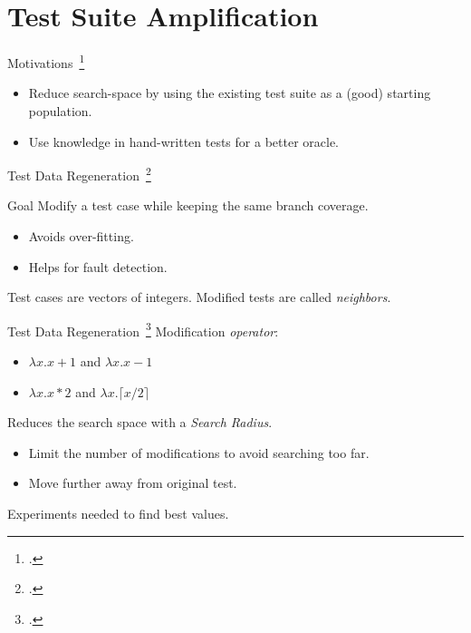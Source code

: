 \documentclass{beamer}
\begin{document}
\section{Test Suite Amplification}

\begin{frame}{Motivations~\footcite{danglot2017emerging}}
  \begin{itemize}
    \item Reduce search-space by using the existing test suite as a (good) starting population.
    \item Use knowledge in hand-written tests for a better oracle.
  \end{itemize}
\end{frame}

\begin{frame}{Test Data Regeneration~\footcite{yoo2012test}}
  \begin{block}{Goal}
    Modify a test case while keeping the same branch coverage.
    \begin{itemize}
      \item Avoids over-fitting.
      \item Helps for fault detection.
    \end{itemize}
  \end{block}

  Test cases are vectors of integers.
  Modified tests are called \emph{neighbors}.
\end{frame}
\begin{frame}{Test Data Regeneration~\footcite{yoo2012test}}
  Modification \emph{operator}:
  \begin{itemize}
    \item $\lambda x. x + 1$ and $\lambda x. x - 1$
    \item $\lambda x. x * 2$ and $\lambda x. \lceil x / 2\rceil$
  \end{itemize}

  \pause{}

  Reduces the search space with a \emph{Search Radius}.
  \begin{itemize}
    \item Limit the number of modifications to avoid searching too far.
    \item Move further away from original test.
  \end{itemize}

  \vfill

  Experiments needed to find best values.
\end{frame}
\end{document}
